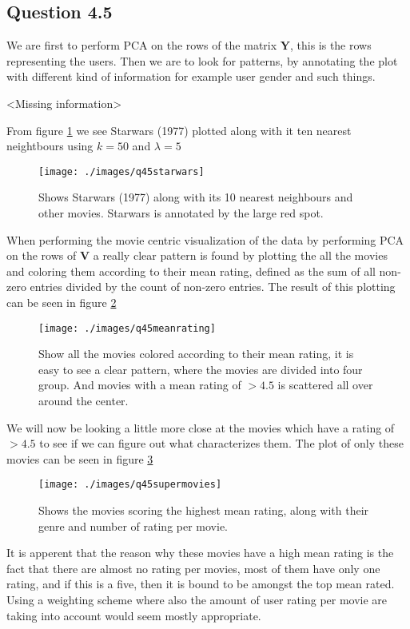 \subsection*{Question 4.5}

We are first to perform PCA on the rows of the matrix $\mathbf{Y}$,
this is the rows representing the users. Then we are to look for
patterns, by annotating the plot with different kind of information
for example user gender and such things.

<Missing information>


From figure \ref{fig:q45starwars} we see Starwars (1977) plotted along
with it ten nearest neightbours using $k = 50$ and $\lambda = 5$

\begin{figure}[!htbp]
  \centering
  \texttt{[image: ./images/q45starwars]}
  \caption{Shows Starwars (1977) along with its 10 nearest neighbours
    and other movies. Starwars is annotated by the large red spot.}
  \label{fig:q45starwars}
\end{figure}

When performing the movie centric visualization of the data by
performing PCA on the rows of $\mathbf{V}$ a really clear pattern is
found by plotting the all the movies and coloring them according to
their mean rating, defined as the sum of all non-zero entries divided
by the count of non-zero entries. The result of this plotting can be seen in figure \ref{fig:q45meanrating}

\begin{figure}[!htbp]
  \centering
  \texttt{[image: ./images/q45meanrating]}
  \caption{Show all the movies colored according to their mean rating,
    it is easy to see a clear pattern, where the movies are divided
    into four group. And movies with a mean rating of $> 4.5$ is
    scattered all over around the center.}
  \label{fig:q45meanrating}
\end{figure}

We will now be looking a little more close at the movies which have a
rating of $> 4.5$ to see if we can figure out what characterizes them.
The plot of only these movies can be seen in figure \ref{fig:q45supermovies}

\begin{figure}[!htbp]
  \centering
  \texttt{[image: ./images/q45supermovies]}
  \caption{Shows the movies scoring the highest mean rating, along
    with their genre and number of rating per movie.}
  \label{fig:q45supermovies}
\end{figure}

It is apperent that the reason why these movies have a high mean
rating is the fact that there are almost no rating per movies, most of
them have only one rating, and if this is a five, then it is bound to
be amongst the top mean rated. Using a weighting scheme where also the
amount of user rating per movie are taking into account would seem
mostly appropriate.
